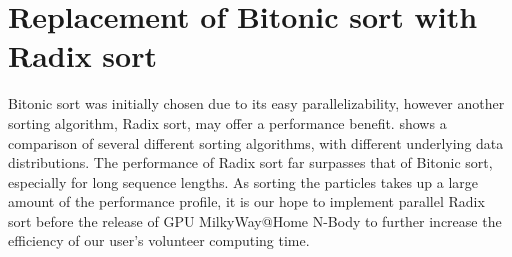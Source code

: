 \documentclass{thesis}
\begin{document}
\section{Replacement of Bitonic sort with Radix sort}
Bitonic sort was initially chosen due to its easy parallelizability, however another sorting algorithm, Radix sort, may offer a performance benefit. \cite{DBLP:journals/corr/BozidarD15} shows a comparison of several different sorting algorithms, with different underlying data distributions. The performance of Radix sort far surpasses that of Bitonic sort, especially for long sequence lengths. As sorting the particles takes up a large amount of the performance profile, it is our hope to implement parallel Radix sort before the release of GPU MilkyWay@Home N-Body to further increase the efficiency of our user's volunteer computing time.




\appendix    %
\end{document}
